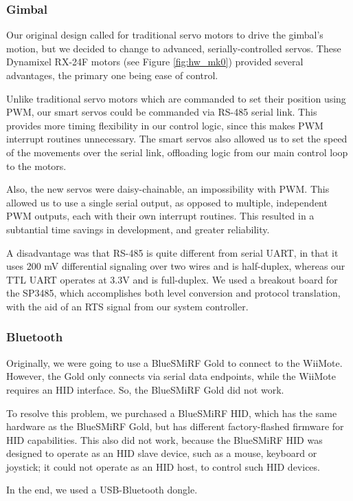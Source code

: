 \documentclass[conference, twocolumn]{IEEEtran}
\begin{document}
\subsubsection{Gimbal}
Our original design called for traditional servo motors to drive the gimbal's motion, but we decided to change to advanced, serially-controlled servos. These Dynamixel RX-24F motors (see Figure \ref{fig:hw_mk0}) provided several advantages, the primary one being ease of control.

Unlike traditional servo motors which are commanded to set their position using PWM, our smart servos could be commanded via RS-485 serial link. This provides more timing flexibility in our control logic, since this makes PWM interrupt routines unnecessary. The smart servos also allowed us to set the speed of the movements over the serial link, offloading logic from our main control loop to the motors.

Also, the new servos were daisy-chainable, an impossibility with PWM. This allowed us to use a single serial output, as opposed to multiple, independent PWM outputs, each with their own interrupt routines. This resulted in a subtantial time savings in development, and greater reliability.

A disadvantage was that RS-485 is quite different from serial UART, in that it uses 200 mV differential signaling over two wires and is half-duplex, whereas our TTL UART operates at 3.3V and is full-duplex. We used a breakout board for the SP3485, which accomplishes both level conversion and protocol translation, with the aid of an RTS signal from our system controller.

\subsubsection{Bluetooth}
Originally, we were going to use a BlueSMiRF Gold to connect to the WiiMote. However, the Gold only connects via serial data endpoints, while the WiiMote requires an HID interface. So, the BlueSMiRF Gold did not work.

To resolve this problem, we purchased a BlueSMiRF HID, which has the same hardware as the BlueSMiRF Gold, but has different factory-flashed firmware for HID capabilities. This also did not work, because the BlueSMiRF HID was designed to operate as an HID slave device, such as a mouse, keyboard or joystick; it could not operate as an HID host, to control such HID devices.

In the end, we used a USB-Bluetooth dongle.
\end{document}
